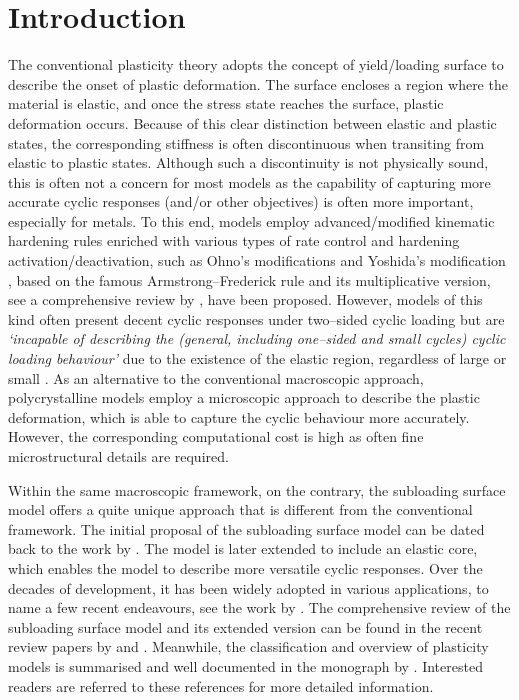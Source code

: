 \section{Introduction}
The conventional plasticity theory adopts the concept of yield/loading surface \citep[see, e.g.,][]{Lemaitre1990,Simo1998} to describe the onset of plastic deformation.
The surface encloses a region where the material is elastic, and once the stress state reaches the surface, plastic deformation occurs.
Because of this clear distinction between elastic and plastic states, the corresponding stiffness is often discontinuous when transiting from elastic to plastic states.
Although such a discontinuity is not physically sound, this is often not a concern for most models as the capability of capturing more accurate cyclic responses (and/or other objectives) is often more important, especially for metals.
To this end, models employ advanced/modified kinematic hardening rules enriched with various types of rate control and hardening activation/deactivation, such as Ohno's modifications \citep[see, e.g.,][]{Ohno1982,Ohno1993,Ohno2021} and Yoshida's modification \citep{Yoshida2002}, based on the famous Armstrong--Frederick rule \citep{Frederick2007} and its multiplicative version, see a comprehensive review by \citet{Chaboche2008}, have been proposed.
However, models of this kind often present decent cyclic responses under two--sided cyclic loading but are \emph{`incapable of describing the \textnormal{(general, including one--sided and small cycles)} cyclic loading behaviour'} \citep[][pg. 273]{Hashiguchi2023} due to the existence of the elastic region, regardless of large or small \citep{Dafalias1977}.
As an alternative to the conventional macroscopic approach, polycrystalline models \citep[see, e.g.,][]{Beyerlein2018} employ a microscopic approach to describe the plastic deformation, which is able to capture the cyclic behaviour more accurately.
However, the corresponding computational cost is high as often fine microstructural details are required.

Within the same macroscopic framework, on the contrary, the subloading surface model offers a quite unique approach that is different from the conventional framework.
The initial proposal of the subloading surface model can be dated back to the work by \citet{Hashiguchi1980}.
The model is later extended \citep{Hashiguchi1989} to include an elastic core, which enables the model to describe more versatile cyclic responses.
Over the decades of development, it has been widely adopted in various applications, to name a few recent endeavours, see the work by \citet{Maranha2016,Xiong2018,Anjiki2021,Yamakawa2021,Yamakawa2022,Lu2023}.
The comprehensive review of the subloading surface model and its extended version can be found in the recent review papers by \citet{Hashiguchi2023a} and \citet{Hashiguchi2024}.
Meanwhile, the classification and overview of plasticity models is summarised and well documented in the monograph by \citet[see][\S~10.2]{Hashiguchi2023}.
Interested readers are referred to these references for more detailed information.

